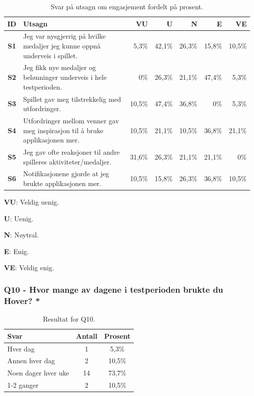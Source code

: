   \begin{table}[H]     
    \small
    \begin{threeparttable}[t]
    \begin{tabularx}{\textwidth}{|>{\bfseries}c|X|r|r|r|r|r|}
        \hline  \textbf{ID} &  \textbf{Utsagn} & \textbf{VU }  &  \textbf{U}  &  \textbf{N}  &  \textbf{E}  &  \textbf{VE}  \\ \hline
        S1 & Jeg var nysgjerrig på hvilke medaljer jeg kunne oppnå underveis i spillet.  & 5,3\% & 42,1\% & 26,3\% & 15,8\% & 10,5\% \\ 
        S2 & Jeg fikk nye medaljer og belønninger underveis i hele testperioden.  & 0\% & 26,3\% & 21,1\% & 47,4\% & 5,3\% \\ 
        S3 & Spillet gav meg tilstrekkelig med utfordringer.  & 10,5\% & 47,4\% & 36,8\% & 0\% & 5,3\% \\ 
        S4 & Utfordringer mellom venner gav meg inspirasjon til å bruke applikasjonen mer.  & 10,5\% & 21,1\% & 10,5\% & 36,8\% & 21,1\% \\ 
        S5 & Jeg gav ofte reaksjoner til andre spilleres aktiviteter/medaljer.  & 31,6\% & 26,3\% & 21,1\% & 21,1\% & 0\% \\ 
        S6 & Notifikasjonene gjorde at jeg brukte applikasjonen mer.  & 10,5\% & 15,8\% & 26,3\% & 36,8\% & 10,5\% \\
         \hline
    \end{tabularx}
    \begin{tablenotes}
    \scriptsize
     \item[] \textbf{VU}: Veldig uenig.
     \item[] \textbf{U}: Uenig.
     \item[] \textbf{N}: Nøytral.
     \item[] \textbf{E}: Enig.
     \item[] \textbf{VE}: Veldig enig.
   \end{tablenotes}
   \end{threeparttable}
   \caption{Svar på utsagn om engasjement fordelt på prosent.}
\end{table}

\subsubsection*{Q10 - Hvor mange av dagene i testperioden brukte du Hover? *}
 \begin{table}[H]
    \centering
    \begin{tabularx}{0.7\textwidth}{|X|c|c|}
        \hline
        \textbf{Svar} & \textbf{Antall} & \textbf{Prosent}  \\  \hline
        Hver dag & 1 & 5,3\%  \\ 
        Annen hver dag & 2 & 10,5\%  \\ 
        Noen dager hver uke & 14 & 73,7\%  \\ 
        1-2 ganger & 2 & 10,5\% \\
         \hline
    \end{tabularx}
        \caption{Resultat for Q10.}
\end{table}

